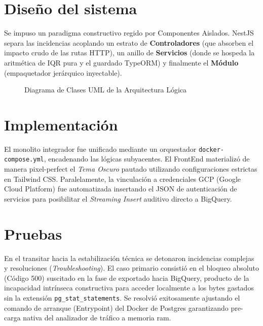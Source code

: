 \documentclass[12pt, a4paper]{article}
\begin{document}
\section{Diseño del sistema}
Se impuso un paradigma constructivo regido por Componentes Aislados. NestJS separa las incidencias acoplando un estrato de \textbf{Controladores} (que absorben el impacto crudo de las rutas HTTP), un anillo de \textbf{Servicios} (donde se hospeda la aritmética de IQR pura y el guardado TypeORM) y finalmente el \textbf{Módulo} (empaquetador jerárquico inyectable).

\begin{figure}[H]
    \centering
    \caption{Diagrama de Clases UML de la Arquitectura Lógica}
    \label{fig:class_diagram}
\end{figure}

\section{Implementación}
El monolito integrador fue unificado mediante un orquestador \texttt{docker-compose.yml}, encadenando las lógicas subyacentes. El FrontEnd materializó de manera pixel-perfect el \textit{Tema Oscuro} pautado utilizando configuraciones estrictas en Tailwind CSS. Paralelamente, la vinculación a credenciales GCP (Google Cloud Platform) fue automatizada insertando el JSON de autenticación de servicios para posibilitar el \textit{Streaming Insert} auditivo directo a BigQuery.

\section{Pruebas}
En el transitar hacia la estabilización técnica se detonaron incidencias complejas y resoluciones (\textit{Troubleshooting}). El caso primario consistió en el bloqueo absoluto (Código 500) suscitado en la fase de exportado hacia BigQuery, producto de la incapacidad intrínseca constructiva para acceder localmente a los bytes gastados sin la extensión \texttt{pg\_stat\_statements}. Se resolvió exitosamente ajustando el comando de arranque (Entrypoint) del Docker de Postgres garantizando pre-carga nativa del analizador de tráfico a memoria ram.
\end{document}
